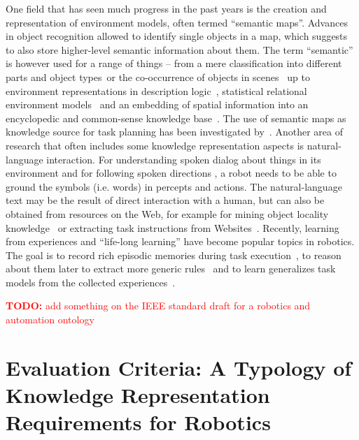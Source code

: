 \documentclass[journal]{IEEEtran}
\newcommand{\todo}[1]{\textcolor{red}{\textbf{TODO:} #1}}
\begin{document}
One field that has seen much progress in the past years is the creation and 
representation of environment models, often termed ``semantic maps''. Advances 
in object recognition allowed to identify single objects in a map, which 
suggests to also store higher-level semantic information about them. The 
term ``semantic'' is however used for a range of things -- from a mere 
classification into different parts and object types~\cite{Rusu08RAS2}or the 
co-occurrence of objects in scenes~\cite{vasudevan08} up to environment 
representations in description logic~\cite{zender2008conceptual}, statistical 
relational environment models~\cite{limketkai05relational} and an embedding 
of spatial information into an encyclopedic and common-sense knowledge 
base~\cite{tenorth10envmodel}. The use of semantic maps as knowledge source 
for task planning has been investigated by~\cite{galindo08taskplanning}. 
% 
Another area of research that often includes some knowledge representation
aspects is natural-language interaction. For understanding spoken dialog
about things in its environment\cite{Mavridis2006} and for following spoken
directions \cite{kollar10natural,matuszek12commands,duvallet13imitation}, a 
robot needs to be able to ground the symbols (i.e. words) in percepts and 
actions. The natural-language text may be the result of direct interaction 
with a human, but can also be obtained from resources on the Web, for example
for mining object locality knowledge~\cite{zhou12webmining} or extracting 
task instructions from Websites~\cite{tenorth10webinstructions}.
% 
Recently, learning from experiences and ``life-long learning'' have
become popular topics in robotics. The goal is to record rich episodic 
memories during task execution~\cite{niemueller2012iros}, to reason about 
them later to extract more generic rules~\cite{winkler13memory} and to learn
generalizes task models from the collected experiences~\cite{rockel13ontology}.


\todo{add something on the IEEE standard draft for a robotics and automation ontology}


\section{Evaluation Criteria: A Typology of Knowledge Representation Requirements for Robotics}
\label{sect|features}
\end{document}
